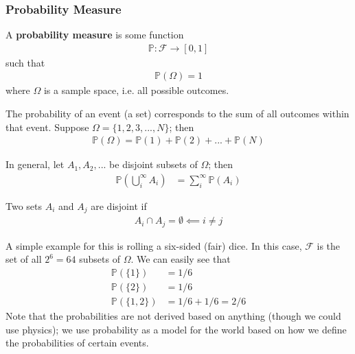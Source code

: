 \subsubsection{Probability Measure}
\begin{definition}
    A \textbf{probability measure} is some function
    \begin{align}
        \mathbb{P}: \mathcal{F} \to [0,1]
    \end{align}
    such that
    \begin{align}
        \mathbb{P}(\Omega) = 1
    \end{align}
    where $\Omega$ is a sample space, i.e. all possible outcomes. 
\end{definition}
The probability of an event (a set) corresponds to the sum of all outcomes within that event. Suppose $\Omega = \{ 1, 2, 3, ..., N \}$; then
\begin{align}
    \mathbb{P}(\Omega) = \mathbb{P}(1) + \mathbb{P}(2) + ... + \mathbb{P}(N)
\end{align}
\begin{proposition}
    In general, let $A_1, A_2, ...$ be disjoint subsets of $\Omega$; then
    \begin{align}
        \mathbb{P}\left(\bigcup_i^\infty A_i\right) &= \sum_i^\infty \mathbb{P}(A_i)
    \end{align}
\end{proposition}
\begin{definition}
    Two sets $A_i$ and $A_j$ are disjoint if
    \begin{align}
        A_i \cap A_j = \emptyset \impliedby i \ne j
    \end{align}
\end{definition}
A simple example for this is rolling a six-sided (fair) dice. In this case, $\mathcal{F}$ is the set of all $2^6 = 64$ subsets of $\Omega$. We can easily see that
\begin{align}
    \mathbb{P}(\{1\}) &= 1/6\\
    \mathbb{P}(\{2\}) &= 1/6\\
    \mathbb{P}(\{1, 2\}) &= 1/6 + 1/6 = 2/6
\end{align}
Note that the probabilities are not derived based on anything (though we could use physics); we use probability as a model for the world based on how we define the probabilities of certain events.

